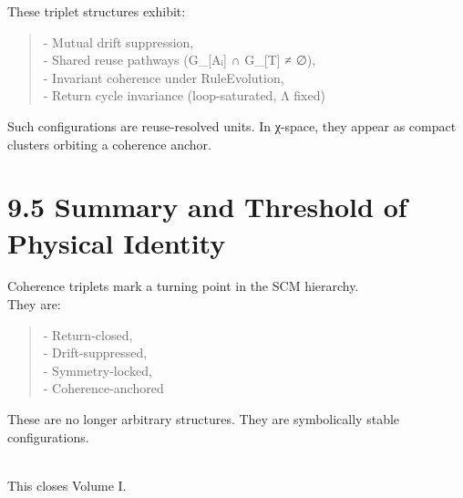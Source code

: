 These triplet structures exhibit:

\begin{quote}
- Mutual drift suppression,\\
- Shared reuse pathways (G\_{[}Aᵢ{]} ∩ G\_{[}T{]} ≠ ∅),\\
- Invariant coherence under RuleEvolution,\\
- Return cycle invariance (loop-saturated, Λ fixed)
\end{quote}

Such configurations are reuse-resolved units. In χ-space, they appear as
compact clusters orbiting a coherence anchor.

\section{9.5 \textbar{} Summary and Threshold of Physical
Identity}\label{summary-and-threshold-of-physical-identity}

Coherence triplets mark a turning point in the SCM hierarchy.\\
They are:

\begin{quote}
- Return-closed,\\
- Drift-suppressed,\\
- Symmetry-locked,\\
- Coherence-anchored
\end{quote}

These are no longer arbitrary structures. They are symbolically stable
configurations.\\
\strut \\
This closes Volume I.
